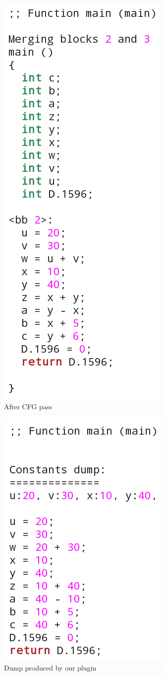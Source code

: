 \begin{figure}[htb]
\centering
\includegraphics{./cfg1}
\caption{After CFG pass}
\label{fig:cfg}
\end{figure}

\begin{figure}[htb]
\centering
\includegraphics{./const-prop1}
\caption{Dump produced by our plugin}
\label{fig:cp}
\end{figure}
